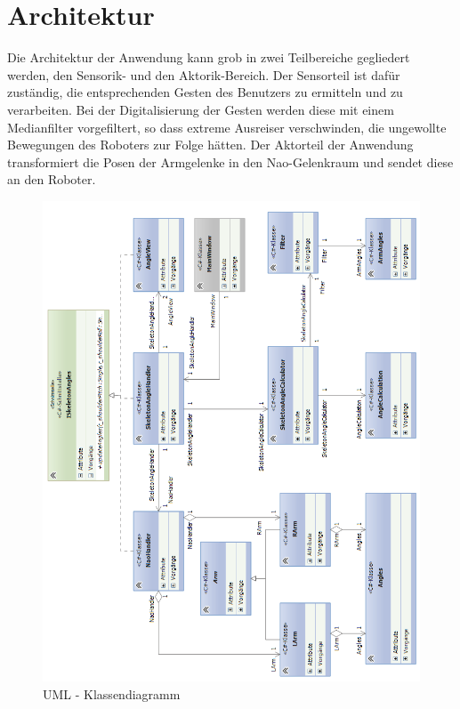 %
%
\section{Architektur}\label{k:Architektur}
Die Architektur der Anwendung kann grob in zwei Teilbereiche gegliedert werden, den Sensorik- und den Aktorik-Bereich.
Der Sensorteil ist dafür zuständig, die entsprechenden Gesten des Benutzers zu ermitteln und zu verarbeiten. Bei der Digitalisierung der Gesten werden diese mit einem Medianfilter vorgefiltert, so dass extreme Ausreiser verschwinden, die ungewollte Bewegungen des Roboters zur Folge hätten.
Der Aktorteil der Anwendung transformiert die Posen der Armgelenke in den Nao-Gelenkraum und sendet diese an den Roboter.

%
%
%


\begin{figure}[H]						
	\centering							
	\includegraphics[scale=0.8]{Bilder/classdiagramm.png}
	\caption{UML - Klassendiagramm}						
	\label{f:classdiagramm}						
\end{figure}

